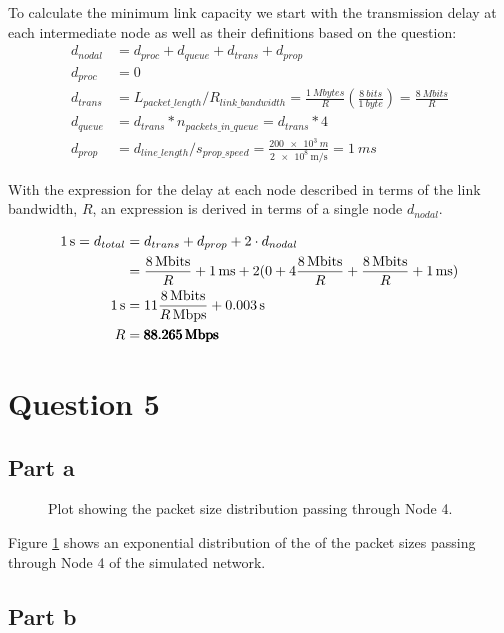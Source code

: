 \documentclass[12pt,letterpaper]{article}
\begin{document}
To calculate the minimum link capacity we start with the transmission delay
at each intermediate node as well as their definitions based on the question:
\begin{align*}
d_{nodal} &= d_{proc} + d_{queue} + d_{trans} + d_{prop} \\
d_{proc} &= 0 \\
d_{trans} &= L_{packet\_length} / R_{link\_bandwidth} = \frac{\SI{1}{Mbytes}}{R}(\frac{\SI{8}{bits}}{\SI{1}{byte}}) = \frac{\SI{8}{Mbits}}{R} \\
d_{queue} &= d_{trans} * n_{packets\_in\_queue} = d_{trans} * 4 \\
d_{prop} &= d_{line\_length} / s_{prop\_speed} = \frac{\SI{200e3}{m}}{\SI{2e8}{\m/\s}} = \SI{1}{ms}
\end{align*}

With the expression for the delay at each node described in terms of the link bandwidth,
$R$, an expression is derived in terms of a single node $d_{nodal}$.

\begin{align*}
\SI{1}{s} = d_{total} &= d_{trans} + d_{prop} + 2 \cdot d_{nodal} \\
&= \frac{\SI{8}{Mbits}}{R} + \SI{1}{ms} + 2(0 + 4\frac{\SI{8}{Mbits}}{R} + \frac{\SI{8}{Mbits}}{R} + \SI{1}{ms}) \\
\SI{1}{s} &= 11\frac{\SI{8}{Mbits}}{\SI[parse-numbers = false]{R}{Mbps}} + \SI{0.003}{s} \\
R &= \pmb{\SI{88.265}{Mbps}} 
\end{align*}

\section*{Question 5}
\subsection*{Part a}

\begin{figure}[h!]
\centering
\caption{Plot showing the packet size distribution passing through Node 4.}
\label{fig:pa}
\end{figure}

Figure \ref{fig:pa} shows an exponential distribution of the of the packet
sizes passing through Node 4 of the simulated network.

\subsection*{Part b}
\end{document}
